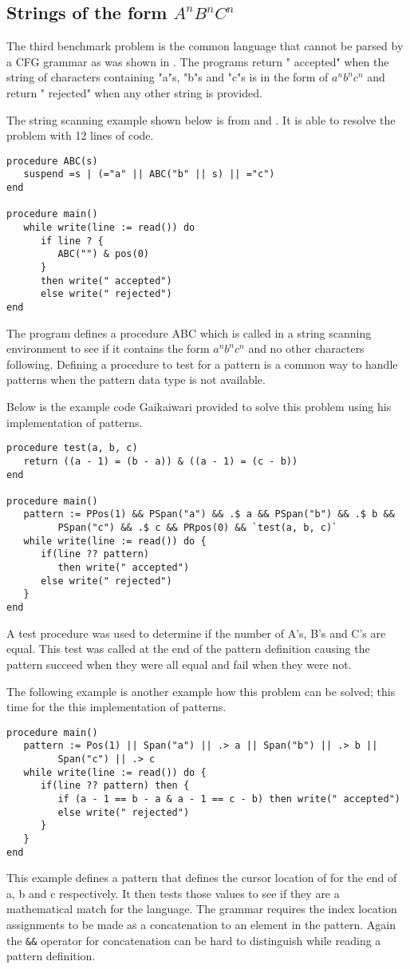 \documentclass{article}
\begin{document}
\subsection{Strings of the form \emph{$A^nB^nC^n$}}
The third benchmark problem is the common language that cannot be parsed by a CFG grammar as was shown in \cite{Gaikaiwari2005}.  The programs return " accepted" when the string of characters containing "a"s, "b"s and "c"s is in the form of $a^nb^nc^n$ and return " rejected" when any other string is provided.

The string scanning example shown below is from \cite{Gaikaiwari2005} and \cite{Griswold1975}.  It is able to resolve the problem with 12 lines of code.
\begin{verbatim}
procedure ABC(s)
   suspend =s | (="a" || ABC("b" || s) || ="c")
end

procedure main()
   while write(line := read()) do
      if line ? {
         ABC("") & pos(0)
      } 
      then write(" accepted")
      else write(" rejected")
end
\end{verbatim}
The program defines a procedure ABC which is called in a string scanning environment to see if it contains the form $a^nb^nc^n$ and no other characters following.  Defining a procedure to test for a pattern is a common way to handle patterns when the pattern data type is not available.

Below is the example code Gaikaiwari provided to solve this problem using his implementation of patterns.  
\begin{verbatim}
procedure test(a, b, c)
   return ((a - 1) = (b - a)) & ((a - 1) = (c - b))
end

procedure main()
   pattern := PPos(1) && PSpan("a") && .$ a && PSpan("b") && .$ b && 
         PSpan("c") && .$ c && PRpos(0) && `test(a, b, c)`
   while write(line := read()) do {
      if(line ?? pattern) 
         then write(" accepted")
      else write(" rejected")
   }
end
\end{verbatim}
A test procedure was used to determine if the number of A's, B's and C's are equal.  This test was called at the end of the pattern definition causing the pattern succeed when they were all equal and fail when they were not.

The following example is another example how this problem can be solved; this time for the this implementation of patterns.
\begin{verbatim}
procedure main()
   pattern := Pos(1) || Span("a") || .> a || Span("b") || .> b || 
         Span("c") || .> c
   while write(line := read()) do {
      if(line ?? pattern) then {
         if (a - 1 == b - a & a - 1 == c - b) then write(" accepted")
         else write(" rejected")
      }
   }
end
\end{verbatim}
This example defines a pattern that defines the cursor location of for the end of a, b and c respectively.  It then tests those values to see if they are a mathematical match for the language.  The grammar requires the index location assignments to be made as a concatenation to an element in the pattern.  Again the \texttt{\&\&} operator for concatenation can be hard to distinguish while reading a pattern definition.
\end{document}
